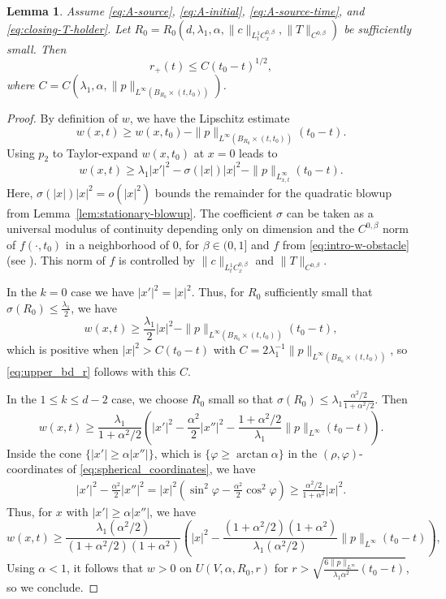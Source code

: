 \documentclass[11pt]{amsart}
\numberwithin{equation}{section}
\numberwithin{figure}{section}
\theoremstyle{plain}
\newtheorem{lem}[thm]{Lemma}
\theoremstyle{definition}
\theoremstyle{remark}
\theoremstyle{plain}
\begin{document}
\begin{lem}\label{lem:r_plus_upper_bd}
Assume \eqref{eq:A-source}, \eqref{eq:A-initial}, \eqref{eq:A-source-time}, and
\eqref{eq:closing-T-holder}. Let $R_0=R_0(d,\lambda_1, \alpha,\|c\|_{L^1_t C^{0,\beta}_x}, \|T\|_{C^{0,\beta}})$ be sufficiently small. Then
\begin{equation}\label{eq:upper_bd_r}
    r_+(t) \leq C(t_0 - t)^{1/2},
\end{equation}
where $C = C(\lambda_1, \alpha, \|p\|_{L^\infty(B_{R_0}\times (t,t_0))})$.
\end{lem}
\begin{proof}
    By definition of $w$, we have the Lipschitz estimate
    \[ w(x,t) \geq w(x,t_0) - \|p\|_{L^\infty(B_{R_0}\times (t,t_0))}(t_0 - t). \]
    Using $p_2$ to Taylor-expand $w(x,t_0)$ at $x=0$ leads to
    \[ w(x,t) \geq \lambda_1|x'|^2 - \sigma(|x|)|x|^2 - \|p\|_{L^\infty_{x,t}}(t_0 - t). \]
    Here, $\sigma(|x|)|x|^2 = o(|x|^2)$ bounds the remainder for the quadratic blowup from Lemma~\ref{lem:stationary-blowup}. The coefficient $\sigma$ can be taken as a universal modulus of continuity depending only on dimension and the $C^{0,\beta}$ norm of $f(\cdot, t_0)$ in a neighborhood of 0, for $\beta\in (0,1]$ and $f$ from \eqref{eq:intro-w-obstacle} (see \cite[Lemma 6.13]{CJK25}). This norm of $f$ is controlled by $\|c\|_{L^1_tC^{0,\beta}_x}$ and $\|T\|_{C^{0,\beta}}$.
    
    In the $k=0$ case we have $|x'|^2 = |x|^2$. Thus, for $R_0$ sufficiently small that $\sigma(R_0) \leq \frac{\lambda_1}{2}$, we have
    \[ w(x,t) \geq \frac{\lambda_1}{2}|x|^2 - \|p\|_{L^\infty(B_{R_0}\times (t,t_0))}(t_0 - t), \]
     which is positive when $|x|^2 > C(t_0-t)$ with $C=2\lambda_1^{-1}\|p\|_{L^\infty(B_{R_0}\times (t,t_0))}$, so \eqref{eq:upper_bd_r} follows with this $C$.

    In the $1\leq k \leq d-2$ case, we choose $R_0$ small so that $\sigma(R_0) \leq \lambda_1\frac{\alpha^2/2}{1 + \alpha^2/2}$. Then
    \begin{equation}\label{eq:w_lower_bound_cone}
    w(x,t) \geq \frac{\lambda_1}{1 + \alpha^2/2}\left(|x'|^2 - \frac{\alpha^2}{2}|x''|^2 - \frac{1 + \alpha^2/2}{\lambda_1}\|p\|_{L^\infty}(t_0 - t)\right).
    \end{equation}
    Inside the cone $\{ |x'| \geq \alpha |x''|\}$, which is $\{ \varphi \geq \arctan \alpha\}$ in the $(\rho, \varphi)$-coordinates of \eqref{eq:spherical_coordinates}, we have
    \[ \begin{aligned}
    |x'|^2 - \frac{\alpha^2}{2}|x''|^2 
    = |x|^2\left(\sin^2\varphi - \frac{\alpha^2}{2}\cos^2\varphi\right)
    \geq \frac{\alpha^2/2}{1 + \alpha^2}|x|^2.
\end{aligned}\]
    Thus, for $x$ with $|x'| \geq \alpha |x''|$, we have
    \[ w(x,t) \geq \frac{\lambda_1(\alpha^2/2)}{(1 + \alpha^2/2)(1 + \alpha^2)}\left(|x|^2 - \frac{(1 + \alpha^2/2)(1 + \alpha^2)}{\lambda_1(\alpha^2/2)}\|p\|_{L^\infty}(t_0 - t)\right), \]
    Using $\alpha < 1$, it follows that $w > 0$ on $U(V,\alpha, R_0, r)$ for $r > \sqrt{\frac{6\|p\|_{L^\infty}}{\lambda_1 \alpha^2}(t_0 - t)}$, so we conclude.
\end{proof}
\end{document}
